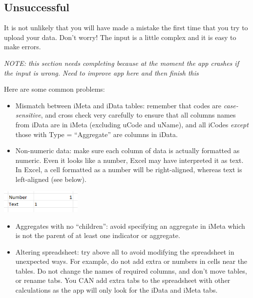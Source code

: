 \documentclass[
  letterpaper,
  DIV=11,
  numbers=noendperiod]{scrreprt}
\providecommand{\tightlist}{%
  \setlength{\itemsep}{0pt}\setlength{\parskip}{0pt}}\usepackage{longtable,booktabs,array}
\begin{document}
\hypertarget{unsuccessful}{%
\subsection{Unsuccessful}\label{unsuccessful}}

It is not unlikely that you will have made a mistake the first time that
you try to upload your data. Don't worry! The input is a little complex
and it is easy to make errors.

\emph{NOTE: this section needs completing because at the moment the app
crashes if the input is wrong. Need to improve app here and then finish
this}

Here are some common problems:

\begin{itemize}
\tightlist
\item
  Mismatch between iMeta and iData tables: remember that codes are
  \emph{case-sensitive}, and cross check very carefully to ensure that
  all columns names from iData are in iMeta (excluding uCode and uName),
  and all iCodes \emph{except} those with Type = ``Aggregate'' are
  columns in iData.
\item
  Non-numeric data: make sure each column of data is actually formatted
  as numeric. Even it looks like a number, Excel may have interpreted it
  as text. In Excel, a cell formatted as a number will be right-aligned,
  whereas text is left-aligned (see below).
\end{itemize}

\includegraphics[width=0.3\textwidth,height=\textheight]{figs/data_input_7.png}

\begin{itemize}
\tightlist
\item
  Aggregates with no ``children'': avoid specifying an aggregate in
  iMeta which is not the parent of at least one indicator or aggregate.
\item
  Altering spreadsheet: try above all to avoid modifying the spreadsheet
  in unexpected ways. For example, do not add extra or numbers in cells
  near the tables. Do not change the names of required columns, and
  don't move tables, or rename tabs. You CAN add extra tabs to the
  spreadsheet with other calculations as the app will only look for the
  iData and iMeta tabs.
\end{itemize}
\end{document}
